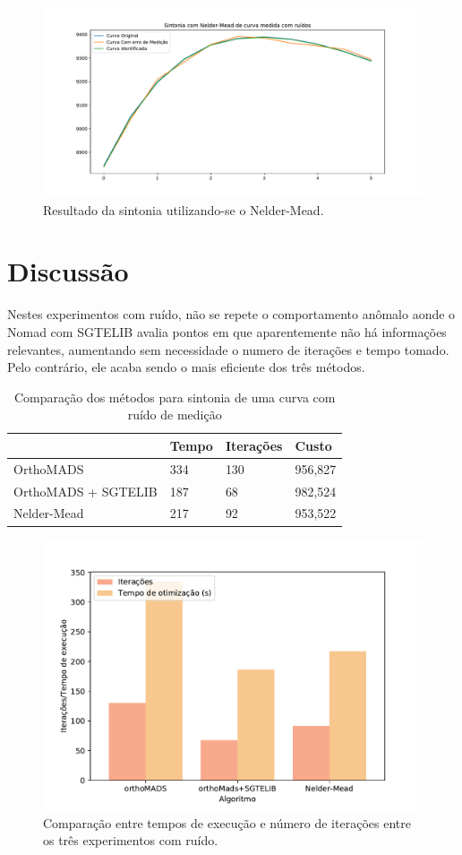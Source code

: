 \begin{figure}[H]
\centering
  \includegraphics[width=1\linewidth]{figs/curva_nm.pdf}
  \caption{Resultado da sintonia utilizando-se o Nelder-Mead.}
  \label{fig:exp2_nm_curve}
\end{figure}

\section{Discussão}
Nestes experimentos com ruído, não se repete o comportamento anômalo aonde o Nomad com SGTELIB avalia pontos em que aparentemente não há informações relevantes, aumentando sem necessidade o numero de iterações e tempo tomado.
%
Pelo contrário, ele acaba sendo o mais eficiente dos três métodos.
%

\begin{table}[H]
\centering
\caption{Comparação dos métodos para sintonia de uma curva com ruído de medição}
\label{my-label2}
\begin{tabular}{|l|l|l|l|}
\hline
                    & Tempo & Iterações & Custo   \\ \hline
OrthoMADS           & 334   & 130       & 956,827 \\ \hline
OrthoMADS + SGTELIB & 187   & 68        & 982,524 \\ \hline
Nelder-Mead         & 217   & 92        & 953,522 \\ \hline
\end{tabular}
\end{table}




\begin{figure}[H]
\centering
  \includegraphics[width=0.7\linewidth]{figs/comp_time_iter_2.pdf}
  \caption{Comparação entre tempos de execução e número de iterações entre os três experimentos com ruído.}
  \label{fig:comp1}
\end{figure}






